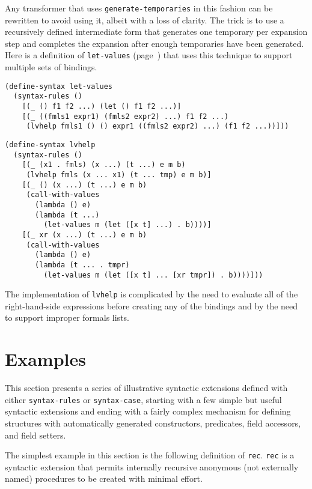 Any transformer that uses \texttt{generate-temporaries} in this fashion can
be rewritten to avoid using it, albeit with a loss of clarity.
The trick is to use a recursively defined intermediate form that
generates one temporary per expansion step and completes the
expansion after enough temporaries have been generated.
\label{syntax_fullletvalues}Here is a definition of \label{syntax_s51}\texttt{let-values}
(page \pageref{binding_desc_let_values}) that uses this technique to support
multiple sets of bindings.


\begin{alltt}
(define-syntax let-values
  (syntax-rules ()
    [(\_{} () f1 f2 ...) (let () f1 f2 ...)]
    [(\_{} ((fmls1 expr1) (fmls2 expr2) ...) f1 f2 ...)
     (lvhelp fmls1 () () expr1 ((fmls2 expr2) ...) (f1 f2 ...))]))

(define-syntax lvhelp
  (syntax-rules ()
    [(\_{} (x1 . fmls) (x ...) (t ...) e m b)
     (lvhelp fmls (x ... x1) (t ... tmp) e m b)]
    [(\_{} () (x ...) (t ...) e m b)
     (call-with-values
       (lambda () e)
       (lambda (t ...)
         (let-values m (let ([x t] ...) . b))))]
    [(\_{} xr (x ...) (t ...) e m b)
     (call-with-values
       (lambda () e)
       (lambda (t ... . tmpr)
         (let-values m (let ([x t] ... [xr tmpr]) . b))))]))
\end{alltt}


The implementation of \texttt{lvhelp} is complicated by the need
to evaluate all of the right-hand-side expressions before creating
any of the bindings and by the need to support improper formals
lists.


\section{\label{syntax_g137}\label{syntax_h4}Examples\label{syntax_SECTSYNTAXEXAMPLES}}



This section presents a series of illustrative syntactic extensions
defined with either \texttt{syntax-rules} or \texttt{syntax-case}, starting with
a few simple but useful syntactic extensions and ending with a
fairly complex mechanism for defining structures with automatically
generated constructors, predicates, field accessors, and field
setters.


The simplest example in this section is the following definition
of \label{syntax_s52}\texttt{rec}.
\texttt{rec} is a syntactic extension that permits internally recursive
anonymous (not externally named) procedures to be created with
minimal effort.


